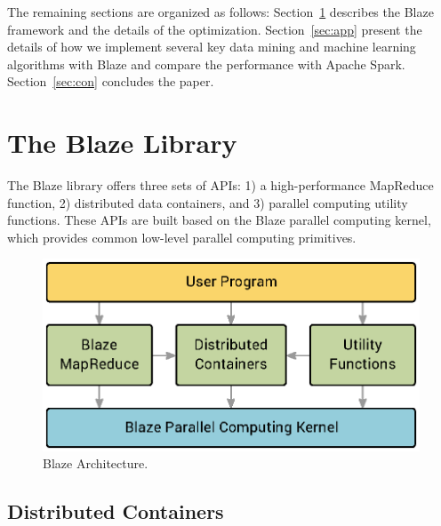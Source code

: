 The remaining sections are organized as follows:
Section~\ref{sec:blaze} describes the Blaze framework and the details of the optimization.
Section~\ref{sec:app} present the details of how we implement several key data mining and machine learning algorithms with Blaze and compare the performance with Apache Spark.
Section~\ref{sec:con} concludes the paper.

\section{The Blaze Library}
\label{sec:blaze}
The Blaze library offers three sets of APIs: 1) a high-performance MapReduce function, 2) distributed data containers, and 3) parallel computing utility functions.
These APIs are built based on the Blaze parallel computing kernel, which provides common low-level parallel computing primitives.



\begin{figure}
  \begin{center}
  \includegraphics[width=0.7\linewidth]{figs/arch0.eps}
  \end{center}
  \vspace{-0.2cm}
  \caption{Blaze Architecture.
  }
  \label{fig:arch}
\end{figure}

\subsection{Distributed Containers}

